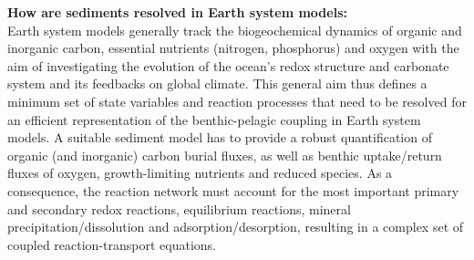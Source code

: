 \documentclass[gmd, manuscript]{copernicus}
\begin{document}

\textbf{How are sediments resolved in Earth system models:}\\
Earth system models generally track the biogeochemical dynamics of organic and inorganic carbon, essential nutrients (nitrogen, phosphorus) and oxygen with the aim of investigating the evolution 
of the ocean's redox structure and carbonate system and its feedbacks on global climate. This general aim thus defines a minimum set of state variables and reaction processes that need to be resolved for an efficient 
representation of the benthic-pelagic coupling in Earth system models. A suitable sediment model has to provide a robust quantification of organic (and inorganic) carbon burial fluxes, as well as 
benthic uptake/return fluxes of oxygen, growth-limiting nutrients and reduced species. As a consequence, the reaction network must account for the most important primary and secondary redox reactions, equilibrium reactions, 
mineral precipitation/dissolution and adsorption/desorption, resulting in a complex set of coupled reaction-transport equations. 
\end{document}
